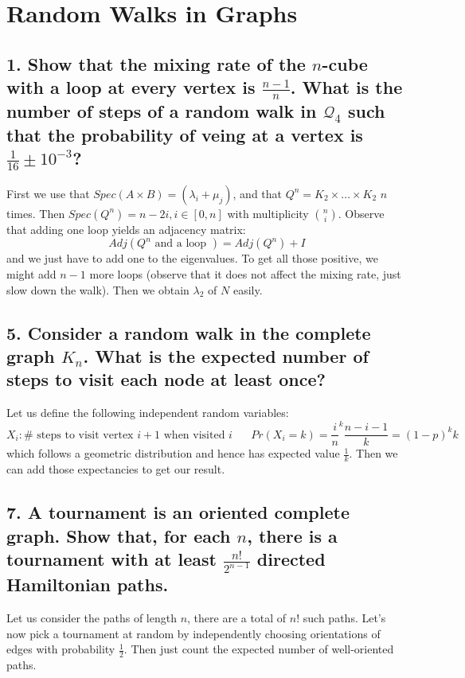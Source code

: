 \section{Random Walks in Graphs}

\subsection[Random Walks - 1]{1. Show that the mixing rate of the $n$-cube with a loop at every vertex is $\frac{n-1}{n}$. What is the number of steps of a random walk in $\mathcal{Q}_4$ such that the probability of veing at a vertex is $\frac{1}{16} \pm 10^{-3}$?}

First we use that $Spec(A \times B) = (\lambda_i + \mu_j)$, and that $Q^n = K_2 \times \dots \times K_2$ $n$ times.
Then $Spec(Q^n) = n - 2i, i \in [0,n]$ with multiplicity $\binom{n}{i}$.
Observe that adding one loop yields an adjacency matrix:
$$Adj(Q^n \text{ and a loop }) = Adj(Q^n) + I$$ and we just have to add one to the eigenvalues.
To get all those positive, we might add $n-1$ more loops (observe that it does not affect the mixing rate, just slow down the walk).
Then we obtain $\lambda_2$ of $N$ easily.

\subsection[Random Walks - 5]{5. Consider a random walk in the complete graph $K_n$. What is the expected number of steps to visit each node at least once?}

Let us define the following independent random variables:
$$X_i : \# \text{ steps to visit vertex $i + 1$ when visited $i$ } \quad Pr(X_i = k) = \frac{i}{n}^k \frac{n-i-1}{k} = (1 - p)^k k$$
which follows a geometric distribution and hence has expected value $\frac{1}{k}$.
Then we can add those expectancies to get our result.

\subsection[Random Walks - 7]{7. A tournament is an oriented complete graph. Show that, for each $n$, there is a tournament with at least $\frac{n!}{2^{n-1}}$ directed Hamiltonian paths.}

Let us consider the paths of length $n$, there are a total of $n!$ such paths.
Let's now pick a tournament at random by independently choosing orientations of edges with probability $\frac{1}{2}$.
Then just count the expected number of well-oriented paths.

